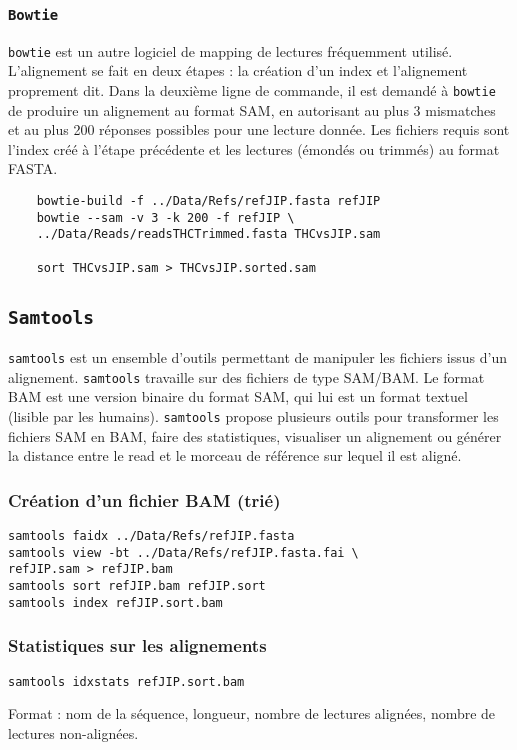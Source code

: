 \documentclass[a4paper,12pt]{article}
\begin{document}
\subsubsection{\tt{Bowtie}}
{\tt bowtie} est un autre logiciel de mapping de lectures fréquemment utilisé. L'alignement se fait en deux étapes : la création d'un index et l'alignement proprement dit. Dans la deuxième ligne de commande, il est demandé à {\tt bowtie} de produire un alignement au format SAM, en autorisant au plus 3 mismatches et au plus 200 réponses possibles pour une lecture donnée. Les fichiers requis sont l'index créé à l'étape précédente et les lectures (émondés ou trimmés) au format FASTA.

\begin{lstlisting}
	bowtie-build -f ../Data/Refs/refJIP.fasta refJIP
	bowtie --sam -v 3 -k 200 -f refJIP \
	../Data/Reads/readsTHCTrimmed.fasta THCvsJIP.sam
	
	sort THCvsJIP.sam > THCvsJIP.sorted.sam
\end{lstlisting}

\subsection{{\tt Samtools}}

{\tt samtools} est un ensemble d'outils permettant de manipuler les fichiers issus d'un alignement. {\tt samtools} travaille sur des fichiers de type SAM/BAM. Le format BAM est une version binaire du format SAM, qui lui est un format textuel (lisible par les humains). {\tt samtools} propose plusieurs outils pour transformer les fichiers SAM en BAM, faire des statistiques, visualiser un alignement ou générer la distance entre le read et le morceau de référence sur lequel il est aligné.

\subsubsection*{Création d'un fichier BAM (trié)}
\begin{lstlisting}
samtools faidx ../Data/Refs/refJIP.fasta
samtools view -bt ../Data/Refs/refJIP.fasta.fai \
refJIP.sam > refJIP.bam
samtools sort refJIP.bam refJIP.sort
samtools index refJIP.sort.bam
\end{lstlisting}

\subsubsection*{Statistiques sur les alignements}
\begin{lstlisting}
samtools idxstats refJIP.sort.bam
\end{lstlisting}
Format : nom de la séquence, longueur, nombre de lectures alignées, nombre de lectures non-alignées.
\end{document}
